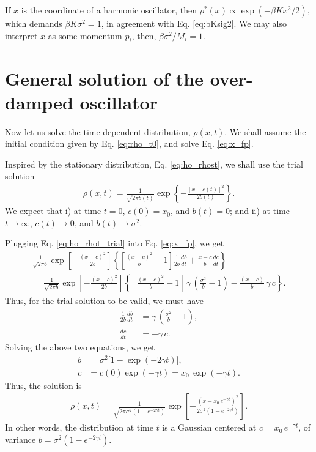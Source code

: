 \documentclass[11pt]{article}
\begin{document}
If $x$ is the coordinate of a harmonic oscillator,
then $\rho^*(x) \propto \exp( -\beta K x^2/2 )$,
which demands $\beta K \sigma^2 = 1$,
in agreement with Eq. \eqref{eq:bKsig2}.
%
We may also interpret $x$ as some momentum $p_i$,
%
then, $\beta \sigma^2 / M_i = 1$.



\section{General solution of the over-damped oscillator}



Now let us solve the time-dependent distribution, $\rho(x, t)$.
%
We shall assume the initial condition given by Eq. \eqref{eq:rho_t0},
%
and solve Eq. \eqref{eq:x_fp}.

Inspired by the stationary distribution, Eq. \eqref{eq:ho_rhost},
we shall use the trial solution
%
\begin{align}
\rho(x, t)
=
\frac{ 1 } { \sqrt{ 2 \pi b(t) } }
\exp \left\{
  -\frac{ [x - c(t)]^2 } { 2 b(t) }
\right\}.
\label{eq:ho_rhot_trial}
\end{align}
%
We expect that
i) at time $t = 0$,
$c(0) = x_0$, and $b(t) = 0$;
and
ii) at time $t \rightarrow \infty$,
$c(t) \rightarrow 0$, and $b(t) \rightarrow \sigma^2$.

Plugging Eq. \eqref{eq:ho_rhot_trial} into Eq. \eqref{eq:x_fp},
we get
\begin{multline}
  \frac{ 1 } { \sqrt{ 2 \pi b } }
  \exp \left[
    - \frac{ (x - c)^2 } { 2 b }
  \right]
  \left\{
    \left[
      \frac { (x - c)^2 } { b } - 1
    \right]
    \frac{ 1 } { 2 b }
    \frac{ d b } { d t }
    +
    \frac { x - c } { b }
    \frac { d c } { d t }
  \right\} \\
=
  \frac{ 1 } { \sqrt{ 2 \pi b } }
  \exp \left[
    - \frac{ (x - c)^2 } { 2 b }
  \right]
  \left\{
    \left[
      \frac{ (x - c)^2 } { b } - 1
    \right]
    \, \gamma \,
    \left(\frac{ \sigma^2 } b - 1\right)
    -
    \frac{ (x - c) } { b } \, \gamma \, c
  \right\}.
\end{multline}
%
Thus, for the trial solution to be valid,
we must have
\begin{align*}
\frac{ 1 } { 2 b }
\frac{ d b } { d t }
&=
\gamma \,
\left(\frac{ \sigma^2 } b - 1\right),
\\
\frac { d c } { d t }
&=
-\gamma \, c.
\end{align*}
Solving the above two equations, we get
\begin{align*}
b &= \sigma^2 \bigl[1 - \exp( - 2 \gamma t) \bigr],
\\
c &= c(0) \exp(-\gamma t) = x_0 \, \exp(-\gamma t).
\end{align*}
%
Thus, the solution is
%
\begin{align}
\rho(x, t)
=
\frac{ 1 } { \sqrt{ 2 \pi \sigma^2 (1 - e^{-2\gamma t}) } }
\exp \left[
  -\frac{ ( x - x_0 \, e^{-\gamma t} )^2 } { 2 \sigma^2 (1 - e^{-2\gamma t}) }
\right].
\label{eq:ho_rhot}
\end{align}
In other words,
the distribution at time $t$ is
a Gaussian centered at $c = x_0 \, e^{-\gamma t}$,
of variance $b = \sigma^2 (1 - e^{-2\gamma t})$.
\end{document}
